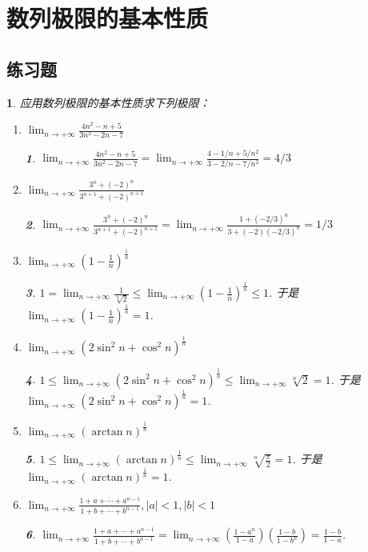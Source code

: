 \documentclass[utf8]{book}
\newtheorem{example}{}[section]             %
\newtheorem{solution}{}
\begin{document}
\section{数列极限的基本性质}
\subsection{练习题}
\begin{example}应用数列极限的基本性质求下列极限：
\renewcommand\labelenumi{\normalfont(\theenumi)}
\begin{enumerate}
\item $\displaystyle \lim_{n\to +\infty}\frac{4n^2-n +5}{3n^2 -2n -7}$
\begin{solution}
$\displaystyle \lim_{n\to +\infty}\frac{4n^2-n +5}{3n^2 -2n -7}=\lim_{n\to +\infty}\frac{4-1/n +5/n^2}{3-2/n -7/n^2} = 4/3$
\end{solution}
\item $\displaystyle \lim_{n\to +\infty}\frac{3^n+(-2)^n}{3^{n+1} +(-2)^{n+1}}$
\begin{solution}
$\displaystyle \lim_{n\to +\infty}\frac{3^n+(-2)^n}{3^{n+1} +(-2)^{n+1}}=\lim_{n\to +\infty}\frac{1+(-2/3)^n}{3+(-2)(-2/3)^n} = 1/3$
\end{solution}
\item $\displaystyle \lim_{n\to +\infty}\left(1-\frac{1}{n}\right)^{\frac{1}{n}}$
\begin{solution}
$1 = \displaystyle \lim_{n\to +\infty}\frac{1}{\sqrt[n]2} \leq \lim_{n\to +\infty}\left(1-\frac{1}{n}\right)^{\frac{1}{n}} \leq 1$. 于是 $\displaystyle \lim_{n\to +\infty}\left(1-\frac{1}{n}\right)^{\frac{1}{n}} = 1$.
\end{solution}
\item $\displaystyle \lim_{n\to +\infty}(2\sin^2n+\cos^2n)^{\frac{1}{n}}$
\begin{solution}
$1 \leq \displaystyle \lim_{n\to +\infty}(2\sin^2n+\cos^2n)^{\frac{1}{n}}\leq \lim_{n\to +\infty}\sqrt[n]2 = 1$. 
于是 $\displaystyle \lim_{n\to +\infty}(2\sin^2n+\cos^2n)^{\frac{1}{n}} = 1$.
\end{solution}
\item $\displaystyle \lim_{n\to +\infty}(\arctan n)^{\frac{1}{n}}$
\begin{solution}
$1 \leq \displaystyle \lim_{n\to +\infty}(\arctan n)^{\frac{1}{n}}\leq \lim_{n\to +\infty}\sqrt[n]{\frac{\pi}{2}} = 1$. 
于是 $\displaystyle \lim_{n\to +\infty}(\arctan n)^{\frac{1}{n}} = 1$.
\end{solution}
\item $\displaystyle \lim_{n\to +\infty}\frac{1+a+\cdots+a^{n-1}}{1+b+\cdots +b^{n-1}}, |a| < 1, |b| < 1$
\begin{solution}
$\displaystyle \lim_{n\to +\infty}\frac{1+a+\cdots+a^{n-1}}{1+b+\cdots +b^{n-1}} = 
\lim_{n\to +\infty}\left(\frac{1-a^n}{1-a}\right)\left(\frac{1-b}{1-b^n}\right) = \frac{1-b}{1-a}$. 
\end{solution}


\end{enumerate}
\end{example}
\end{document}
